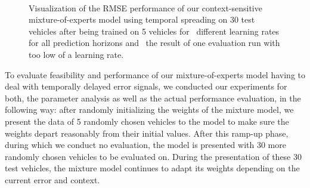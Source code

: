 \begin{figure}[t]
    \centering
    \\
    \caption{Visualization of the \ac{RMSE} performance of our context-sensitive mixture-of-experts model using temporal spreading on \num{30} test vehicles after being trained on \num{5} vehicles for~\protect{} different learning rates for all prediction horizons and~\protect{} the result of one evaluation run with too low of a learning rate.}
    \label{fig:mix_parameters1}
\end{figure}

To evaluate feasibility and performance of our mixture-of-experts model having to deal with temporally delayed error signals, we conducted our experiments for both, the parameter analysis as well as the actual performance evaluation, in the following way:
after randomly initializing the weights of the mixture model, we present the data of \num{5} randomly chosen vehicles to the model to make sure the weights depart reasonably from their initial values.
After this ramp-up phase, during which we conduct no evaluation, the model is presented with \num{30} more randomly chosen vehicles to be evaluated on.
During the presentation of these \num{30} test vehicles, the mixture model continues to adapt its weights depending on the current error and context.

